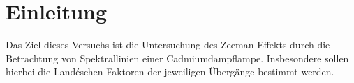 \section{Einleitung}
Das Ziel dieses Versuchs ist die Untersuchung des Zeeman-Effekts durch die Betrachtung von Spektrallinien einer Cadmiumdampflampe. Insbesondere sollen hierbei
die Landéschen-Faktoren der jeweiligen Übergänge bestimmt werden.
